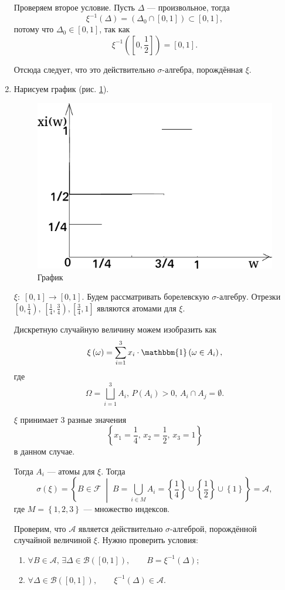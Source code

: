 \begin{enumerate}[label=\alph*)]
Проверяем второе условие.
Пусть $ \Delta $ --- произвольное,
тогда
$$ \xi^{-1} \left( \Delta \right) =
\left( \Delta_0 \cap \left[ 0, 1 \right] \right) \subset \left[ 0, 1 \right],$$
потому что $ \Delta_0 \in \left[ 0, 1 \right] $, так как
$$ \xi^{-1} \left( \left[ 0, \frac{1}{2} \right] \right) = \left[ 0, 1 \right].$$


Отсюда следует, что это действительно $ \sigma $-алгебра, порождённая $ \xi $.
\item Нарисуем график (рис. \ref{fig:8181}).

\begin{figure}[h!]
  \centering
  \includegraphics[width=.4\textwidth]{./pictures/8_18_1.png}
  \caption{График}
  \label{fig:8181}
\end{figure}

$ \xi: \; \left[ 0, 1 \right] \rightarrow \left[ 0, 1 \right] $.
Будем рассматривать борелевскую $ \sigma $-алгебру.
Отрезки
$ \left[ 0, \frac{1}{4} \right), \, \left[ \frac{1}{4}, \frac{3}{4} \right), \left[ \frac{3}{4}, 1 \right] $ являются атомами для $ \xi $.

Дискретную случайную величину можем изобразить как
$$ \xi \left( \omega \right) =
\sum \limits_{i=1}^3 x_i \cdot \mathbbm{1} \left( \omega \in A_i \right),$$
где
$$ \Omega =
\bigsqcup \limits_{i=1}^3 A_i, \,
P \left( A_i \right) > 0, \,
A_i \cap A_j =
\emptyset.$$

$ \xi $ принимает 3 разные значения
$$ \left\{ x_1 = \frac{1}{4}, \, x_2 = \frac{1}{2}, \, x_3 = 1 \right\} $$
в данном случае.

Тогда $A_i$ --- атомы для $ \xi $.
Тогда
$$ \sigma \left( \xi \right) =
\left\{ B \in \mathcal{F} \; \middle| \; B = \bigcup \limits_{i \in M} A_i = \left\{ \frac{1}{4} \right\} \cup \left\{ \frac{1}{2} \right\} \cup \left\{ 1 \right\} \right\} =
\mathcal{A},$$
где $M = \left\{ 1, 2, 3 \right\} $ --- множество индексов.

Проверим, что $ \mathcal{A} $ является действительно $ \sigma $-алгеброй, порождённой случайной величиной $ \xi $.
Нужно проверить условия:
\begin{enumerate}
\item $ \forall B \in \mathcal{A}, \, \exists \Delta \in \mathcal{B} \left( \left[ 0, 1 \right] \right), \qquad B = \xi^{-1} \left( \Delta \right) $;
\item $ \forall \Delta \in \mathcal{B} \left( \left[ 0, 1 \right] \right), \qquad \xi^{-1} \left( \Delta \right) \in \mathcal{A} $.
\end{enumerate}


\end{enumerate}
